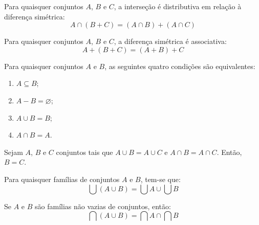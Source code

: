 \begin{proposicao}
    \label{prop:distributividade_simetrica}
    Para quaisquer conjuntos \(A\), \(B\) e \(C\), a interseção é distributiva em relação à diferença simétrica:
    \[ A \cap (B + C) = (A \cap B) + (A \cap C) \]
\end{proposicao}

\begin{proposicao}
    \label{prop:associatividade_simetrica}
    Para quaisquer conjuntos \(A\), \(B\) e \(C\), a diferença simétrica é associativa:
    \[ A + (B + C) = (A + B) + C \]
\end{proposicao}

\begin{proposicao}
    \label{prop:condicoes_equivalentes_inclusao}
    Para quaisquer conjuntos \(A\) e \(B\), as seguintes quatro condições são equivalentes:
    \begin{enumerate}
        \item[(a)] \(A \subseteq B\);
        \item[(b)] \(A - B = \varnothing\);
        \item[(c)] \(A \cup B = B\);
        \item[(d)] \(A \cap B = A\).
    \end{enumerate}
\end{proposicao}

\begin{proposicao}
    \label{prop:unicidade_por_uniao_e_intersecao}
    Sejam \(A\), \(B\) e \(C\) conjuntos tais que \(A \cup B = A \cup C\) e \(A \cap B = A \cap C\). Então, \(B = C\).
\end{proposicao}

\begin{proposicao}
    \label{prop:uniao_da_uniao_de_familias}
    Para quaisquer famílias de conjuntos \(A\) e \(B\), tem-se que:
    \[ \bigcup(A \cup B) = \bigcup A \cup \bigcup B \]
\end{proposicao}

\begin{proposicao}
    \label{prop:intersecao_da_uniao_de_familias}
    Se \(A\) e \(B\) são famílias não vazias de conjuntos, então:
    \[ \bigcap(A \cup B) = \bigcap A \cap \bigcap B \]
\end{proposicao}

